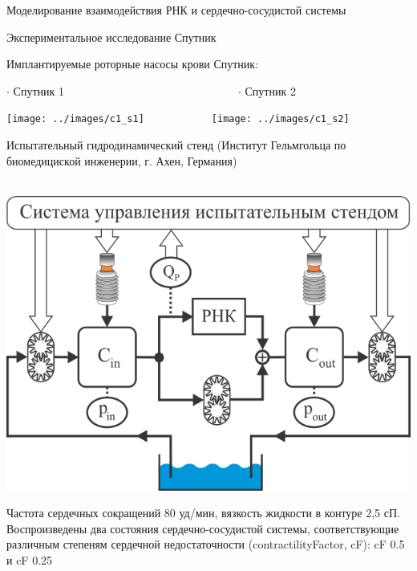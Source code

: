 \documentclass[a4paper, 9pt]{beamer}
\begin{document}
\begin{frame}{Моделирование взаимодействия РНК и сердечно-сосудистой системы}
\begin{minipage}[ht]{0.64\textwidth}
\end{minipage}

\vskip2pt


\end{frame}


\begin{frame}{Экспериментальное исследование Спутник}

\scriptsize
\begin{minipage}[ht]{0.49\textwidth}

Имплантируемые роторные насосы крови Спутник:

$\cdot$ Спутник 1~~~~~~~~~~~~~~~~~~~~~~~~~~~~~~~$\cdot$ Спутник 2

\texttt{[image: ../images/c1\_s1]}~~~~~~~~~~~~\texttt{[image: ../images/c1\_s2]}

\vskip5pt
Испытательный гидродинамический стенд \tiny (Институт Гельмгольца по биомедициской инженерии, г. Ахен, Германия) \vskip2pt

{~~~~~~~~~~~~~~~~\centering\includegraphics[scale=0.65]{../images/mcl_scheme_pres}}

\vskip5pt
\tiny Частота сердечных сокращений 80 уд/мин, вязкость жидкости в контуре 2,5 сП. Воспроизведены два состояния сердечно-сосудистой системы, соответствующие различным степеням сердечной недостаточности (contractilityFactor, cF): cF 0.5 и cF 0.25 \\ \vskip5pt


\end{minipage}
\end{frame}
\end{document}
